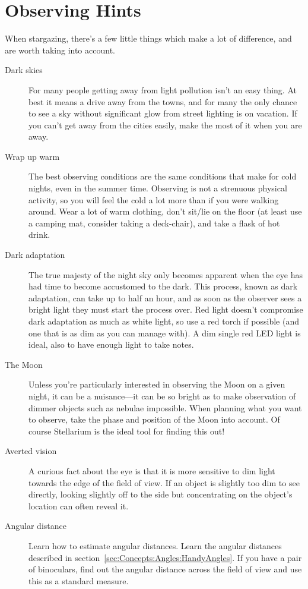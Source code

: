 \section{Observing Hints}
\label{sec:observing_hints}

When stargazing, there's a few little things which make a lot of
difference, and are worth taking into account.

\begin{description}
\item[Dark skies] For many people getting away from light pollution
isn't an easy thing. At best it means a drive away from the towns, and
for many the only chance to see a sky without significant glow from
street lighting is on vacation. If you can't get away from the cities
easily, make the most of it when you are away.

\item[Wrap up warm] The best observing conditions are the same
conditions that make for cold nights, even in the summer time. Observing
is not a strenuous physical activity, so you will feel the cold a lot
more than if you were walking around. Wear a lot of warm clothing, don't
sit/lie on the floor (at least use a camping mat, consider taking a
deck-chair), and take a flask of hot drink.

\item[Dark adaptation] The true majesty of the night sky only
becomes apparent when the eye has had time to become accustomed to the
dark.  This process, known as dark adaptation, can take up to half an
hour, and as soon as the observer sees a bright light they must start
the process over. Red light doesn't compromise dark adaptation as much
as white light, so use a red torch if possible (and one that is as dim
as you can manage with). A dim single red LED light is ideal, also to
have enough light to take notes.

\item[The Moon] Unless you're particularly interested in observing the
Moon on a given night, it can be a nuisance---it can be so bright as
to make observation of dimmer objects such as nebulae impossible. When
planning what you want to observe, take the phase and position of the
Moon into account. Of course Stellarium is the ideal tool for finding
this out!

\item[Averted vision] A curious fact about the eye is that it is more
sensitive to dim light towards the edge of the field of view. If an
object is slightly too dim to see directly, looking slightly off to the
side but concentrating on the object's location can often reveal it.

\item[Angular distance] Learn how to estimate angular distances. Learn
  the angular distances described in
  section~\ref{sec:Concepts:Angles:HandyAngles}. If you have a pair of
  binoculars, find out the angular distance across the field of view
  and use this as a standard measure.
\end{description}


